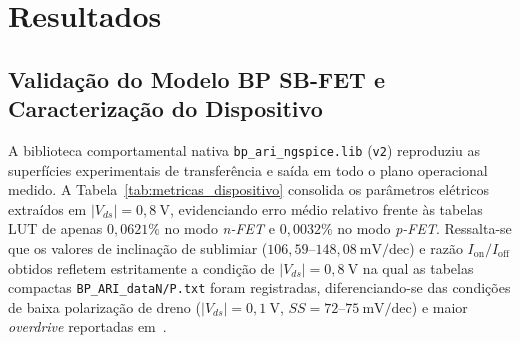 \section{Resultados}\label{sec:resultados}

\subsection{Valida\c{c}\~{a}o do Modelo BP SB-FET e Caracteriza\c{c}\~{a}o do Dispositivo}\label{sec:res_modelo}

A biblioteca comportamental nativa \texttt{bp\_ari\_ngspice.lib} (\texttt{v2}) reproduziu as superf\'{i}cies experimentais de transfer\^{e}ncia e sa\'{i}da em todo o plano operacional medido. A Tabela~\ref{tab:metricas_dispositivo} consolida os par\^{a}metros el\'{e}tricos extra\'{i}dos em $|V_{ds}| = 0{,}8\ \text{V}$, evidenciando erro m\'{e}dio relativo frente \`{a}s tabelas LUT de apenas $0{,}0621\%$ no modo \textit{n-FET} e $0{,}0032\%$ no modo \textit{p-FET}. Ressalta-se que os valores de inclina\c{c}\~{a}o de sublimiar ($106{,}59\text{--}148{,}08\ \text{mV/dec}$) e raz\~{a}o $I_{\mathrm{on}}/I_{\mathrm{off}}$ obtidos refletem estritamente a condi\c{c}\~{a}o de $|V_{ds}| = 0{,}8\ \text{V}$ na qual as tabelas compactas \texttt{BP\_ARI\_dataN/P.txt} foram registradas, diferenciando-se das condi\c{c}\~{o}es de baixa polariza\c{c}\~{a}o de dreno ($|V_{ds}| = 0{,}1\ \text{V}$, $SS = 72\text{--}75\ \text{mV/dec}$) e maior \textit{overdrive} reportadas em~\cite{wu2020reconfigurable}.

\begin{table}[htbp]
\centering
\caption{M\'{e}tricas el\'{e}tricas do dispositivo BP SB-FET extra\'{i}das no \texttt{ngspice-47} ($|V_{ds}|=0{,}8\ \text{V}$).}
\label{tab:metricas_dispositivo}
\end{table}

